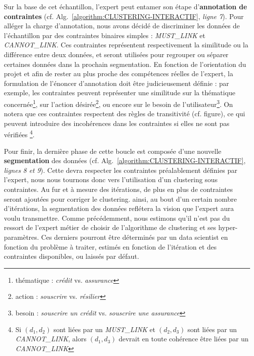 		Sur la base de cet échantillon, l'expert peut entamer son étape d'\textbf{annotation de contraintes} (cf. Alg.~\ref{algorithm:CLUSTERING-INTERACTIF}, \textit{ligne 7}).
		Pour alléger la charge d'annotation, nous avons décidé de discriminer les données de l'échantillon par des contraintes binaires simples : \textit{MUST\_LINK} et \textit{CANNOT\_LINK}. Ces contraintes représentent respectivement la similitude ou la différence entre deux données, et seront utilisées pour regrouper ou séparer certaines données dans la prochain segmentation.
		En fonction de l'orientation du projet et afin de rester au plus proche des compétences réelles de l'expert, la formulation de l'énoncer d'annotation doit être judicieusement définie : par exemple, les contraintes peuvent représenter une similitude
		sur la thématique concernée\footnote{thématique : \textit{crédit} vs. \textit{assurance}},
		sur l'action désirée\footnote{action : \textit{souscrire} vs. \textit{résilier}},
		ou encore sur le besoin de l'utilisateur\footnote{besoin : \textit{souscrire un crédit} vs. \textit{souscrire une assurance}}.
		On notera que ces contraintes respectent des règles de transitivité (cf. figure), ce qui peuvent introduire des incohérences dans les contraintes si elles ne sont pas vérifiées
		\footnote{Si $(d_1, d_2)$ sont liées par un \textit{MUST\_LINK} et $(d_2, d_3)$ sont liées par un \textit{CANNOT\_LINK}, alors $(d_1, d_3)$ devrait en toute cohérence être liées par un \textit{CANNOT\_LINK}}.
		
		Pour finir, la dernière phase de cette boucle est composée d'une nouvelle \textbf{segmentation} des données (cf. Alg.~\ref{algorithm:CLUSTERING-INTERACTIF}, \textit{lignes 8 et 9}). Cette devra respecter les contraintes préalablement définies par l'expert, nous nous tournons donc vers l'utilisation d'un clustering sous contraintes.
		Au fur et à mesure des itérations, de plus en plus de contraintes seront ajoutées pour corriger le clustering. ainsi, au bout d'un certain nombre d'itérations, la segmentation des données reflétera la vision que l'expert aura voulu transmettre.
		Comme précédemment, nous estimons qu'il n'est pas du ressort de l'expert métier de choisir de l'algorithme de clustering et ses hyper-paramètres. Ces derniers pourront être déterminés par un data scientist en fonction du problème à traiter, estimés en fonction de l'itération et des contraintes disponibles, ou laissés par défaut.
		
